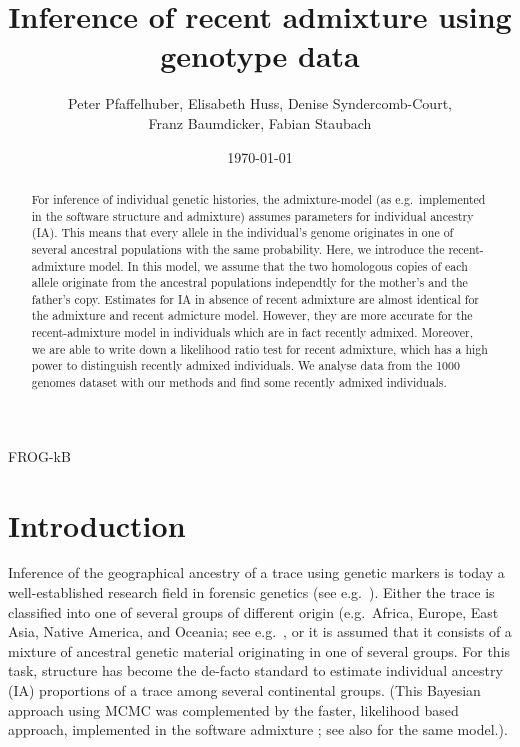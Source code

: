\documentclass[12pt]{article}
\theoremstyle{definition}
\begin{document}
\title{\LARGE Inference of recent admixture using genotype data}

\author{\sc Peter Pfaffelhuber, Elisabeth Huss, Denise
  Syndercomb-Court, \\ \sc Franz Baumdicker, Fabian Staubach}

\date{\today}

\maketitle

FROG-kB




\begin{abstract}
  For inference of individual genetic histories, the admixture-model
  (as e.g.\ implemented in the software {\sc structure} and {\sc
    admixture}) assumes parameters for individual ancestry (IA). This
  means that every allele in the individual's genome originates in one
  of several ancestral populations with the same probability. Here, we
  introduce the recent-admixture model. In this model, we assume that
  the two homologous copies of each allele originate from the
  ancestral populations independtly for the mother's and the father's
  copy. Estimates for IA in absence of recent admixture are almost
  identical for the admixture and recent admicture model. However,
  they are more accurate for the recent-admixture model in individuals
  which are in fact recently admixed.  Moreover, we are able to write
  down a likelihood ratio test for recent admixture, which has a high
  power to distinguish recently admixed individuals. We analyse data
  from the 1000 genomes dataset with our methods and find some
  recently admixed individuals.
\end{abstract}

\section{Introduction}
Inference of the geographical ancestry of a trace using genetic
markers is today a well-established research field in forensic
genetics (see e.g.\ \cite{Phillips2016, Eduardoff2016,
  Kidd2017}). Either the trace is classified into one of several
groups of different origin (e.g.\ Africa, Europe, East Asia, Native
America, and Oceania; see e.g.\ \cite{Snipper2007, Pfaffelhuber2019},
or it is assumed that it consists of a mixture of ancestral genetic
material originating in one of several groups. For this task, {\sc
  structure} \cite{Pritchard2000} has become the de-facto standard to
estimate individual ancestry (IA) proportions of a trace among several
continental groups. (This Bayesian approach using MCMC was
complemented by the faster, likelihood based approach, implemented in
the software {\sc admixture} \cite{Alexander2009}; see also
\cite{Tang2005} for the same model.).
\end{document}
